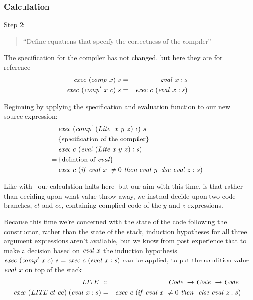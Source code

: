 \documentclass {article}
\begin{document}
\subsubsection{Calculation}

Step 2:
\begin{quote}
``Define equations that specify the correctness of the compiler''
\end{quote}
The specification for the compiler has not
changed, but here they are for reference 
\begin{eqnarray}
\mathit{exec\ }  (\mathit{comp\ }  x)\  s &=& \mathit{eval\ }   x:s \label{spec1.3}\\
\mathit{exec\ }  (\mathit{comp'\ }   x\  c)\ s &=& \mathit{exec\ }  c\  (\mathit{eval\ }  x:s) \label{spec2.3}
\end{eqnarray}

Beginning by applying the 
specification and evaluation function
to our new source expression:
\begin{align*}
	&\Exec (\Compp  (\Lite\ x\ y\ z)\ c)\ s \\
	=\, & \{\mbox{specification of 
				the compiler} \} \\
	&\Exec c\ (\evalf  (\Lite x\ y\ z) : s) \\
	=\, & \{ \mbox{defintion of \eval} \} \\
	&\Exec c\ (\ifff \evalf  x\ \not= 0\ 
		\tthen \evalf  y\ \eelse \evalf  z : s)
\end{align*}

Like with \ite\ our calculation halts here,
but our aim with this time, is that 
rather than deciding upon what value throw away,
we instead decide upon two code branches, $ct$ and $ce$,
containing complied code of the $y$ and $z$ expressions.

Because this time we're concerned with the state of the code 
following the constructor, rather than the state of the stack,
 induction hypotheses for all three argument expressions aren't available,
 but we  know  from past experience
that to make a decision based on $\mathit{eval\ } x$ 
the induction
hypothesis \( \mathit{exec\ } (\mathit{comp'\ }  x\ c)\ s = \mathit{exec\ } c\ (\mathit{eval\ } x:s) \)
can be applied,
to put the condition value $\mathit{eval\ } x$ on top of the stack
\newcommand{\LITE}{\mathit{LITE\ }}
\newcommand{\LITEt}{\textit{LITE}}
\begin{eqnarray}
\LITE &::& \Code \rightarrow \Code \rightarrow \Code \nonumber \\
\Exec (\LITE ct\ ce)\ (\evalf x:s) 
			&=& \Exec c\ (\ifff \evalf x\ \not= 0\ 
				\tthen \ \eelse \evalf  z : s) \nonumber \\
\label{execlite}
\end{eqnarray}
\end{document}

